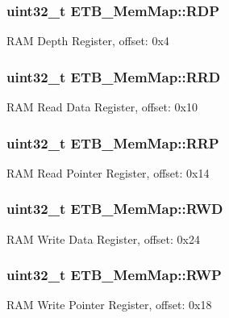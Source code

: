 \subsubsection[{R\+D\+P}]{\setlength{\rightskip}{0pt plus 5cm}uint32\+\_\+t E\+T\+B\+\_\+\+Mem\+Map\+::\+R\+D\+P}\label{struct_e_t_b___mem_map_a1c10bbda4ba1bbe562b76e90bcb1bc61}
R\+A\+M Depth Register, offset\+: 0x4 \hypertarget{struct_e_t_b___mem_map_a270d960dd4107f020db1f9bf7ef845df}{}
\subsubsection[{R\+R\+D}]{\setlength{\rightskip}{0pt plus 5cm}uint32\+\_\+t E\+T\+B\+\_\+\+Mem\+Map\+::\+R\+R\+D}\label{struct_e_t_b___mem_map_a270d960dd4107f020db1f9bf7ef845df}
R\+A\+M Read Data Register, offset\+: 0x10 \hypertarget{struct_e_t_b___mem_map_a891b26a3c18779f393b9f699f42c9916}{}
\subsubsection[{R\+R\+P}]{\setlength{\rightskip}{0pt plus 5cm}uint32\+\_\+t E\+T\+B\+\_\+\+Mem\+Map\+::\+R\+R\+P}\label{struct_e_t_b___mem_map_a891b26a3c18779f393b9f699f42c9916}
R\+A\+M Read Pointer Register, offset\+: 0x14 \hypertarget{struct_e_t_b___mem_map_a44fa135beae1216f33813266c1cdd08b}{}
\subsubsection[{R\+W\+D}]{\setlength{\rightskip}{0pt plus 5cm}uint32\+\_\+t E\+T\+B\+\_\+\+Mem\+Map\+::\+R\+W\+D}\label{struct_e_t_b___mem_map_a44fa135beae1216f33813266c1cdd08b}
R\+A\+M Write Data Register, offset\+: 0x24 \hypertarget{struct_e_t_b___mem_map_a32780b4c79a1f22e2616d845f306f264}{}
\subsubsection[{R\+W\+P}]{\setlength{\rightskip}{0pt plus 5cm}uint32\+\_\+t E\+T\+B\+\_\+\+Mem\+Map\+::\+R\+W\+P}\label{struct_e_t_b___mem_map_a32780b4c79a1f22e2616d845f306f264}
R\+A\+M Write Pointer Register, offset\+: 0x18 \hypertarget{struct_e_t_b___mem_map_a5a471e968aca953fb748c16b10d56939}{}
